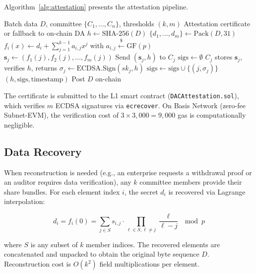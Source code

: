 Algorithm~\ref{alg:attestation} presents the attestation pipeline.

\begin{algorithm}[htbp]
\caption{Shamir-DAC Attestation Pipeline}
\label{alg:attestation}
\begin{algorithmic}[1]
\Require Batch data $D$, committee $\{C_1, \ldots, C_n\}$, thresholds $(k, m)$
\Ensure Attestation certificate or fallback to on-chain DA
\State $h \gets \text{SHA-256}(D)$ 
\State $\{d_1, \ldots, d_m\} \gets \text{Pack}(D, 31)$ 
  \State $f_i(x) \gets d_i + \sum_{j=1}^{k-1} a_{i,j} x^j$ with $a_{i,j} \stackrel{\$}{\leftarrow} \mathrm{GF}(p)$
\EndFor
{}
  \State $\mathbf{s}_j \gets (f_1(j), f_2(j), \ldots, f_m(j))$
  \State Send $(\mathbf{s}_j, h)$ to $C_j$
\EndFor
\State $\text{sigs} \gets \emptyset$
  \State $C_j$ stores $\mathbf{s}_j$, verifies $h$, returns $\sigma_j \gets \text{ECDSA.Sign}(sk_j, h)$
  \State $\text{sigs} \gets \text{sigs} \cup \{(j, \sigma_j)\}$
\EndFor
{}
  \State \Return {}$(h, \text{sigs}, \text{timestamp})$
\Else
  \State Post $D$ on-chain 
\EndIf
\end{algorithmic}
\end{algorithm}

The certificate is submitted to the L1 smart contract
(\texttt{DACAttestation.sol}), which verifies $m$ ECDSA signatures via
\texttt{ecrecover}. On Basis Network (zero-fee Subnet-EVM), the verification
cost of $3 \times 3{,}000 = 9{,}000$ gas is computationally negligible.

\subsection{Data Recovery}

When reconstruction is needed (e.g., an enterprise requests a withdrawal proof
or an auditor requires data verification), any $k$ committee members provide
their share bundles. For each element index $i$, the secret $d_i$ is recovered
via Lagrange interpolation:

\begin{equation}
d_i = f_i(0) = \sum_{j \in S} s_{i,j} \cdot \prod_{\ell \in S, \ell \neq j}
\frac{\ell}{\ell - j} \mod p
\label{eq:lagrange}
\end{equation}

\noindent where $S$ is any subset of $k$ member indices. The recovered
elements are concatenated and unpacked to obtain the original byte sequence
$D$. Reconstruction cost is $O(k^2)$ field multiplications per element.

